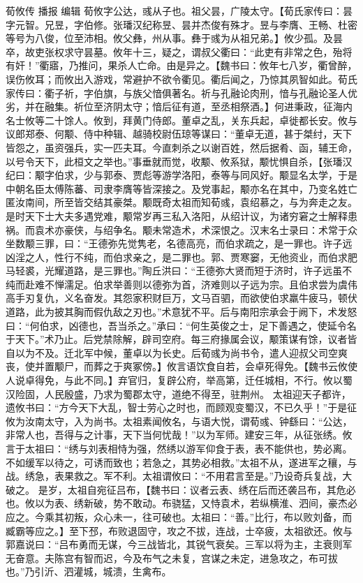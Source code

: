 \documentclass[12pt,UTF8]{ctexbook}
\begin{document}
荀攸传
播报
编辑
荀攸字公达，彧从子也。祖父昙，广陵太守。【荀氏家传曰：昙字元智。兄昱，字伯修。张璠汉纪称昱、昙并杰俊有殊才。昱与李膺、王畅、杜密等号为八俊，位至沛相。攸父彝，州从事。彝于彧为从祖兄弟。】攸少孤。及昙卒，故吏张权求守昙墓。攸年十三，疑之，谓叔父衢曰：“此吏有非常之色，殆将有奸！”衢寤，乃推问，果杀人亡命。由是异之。【魏书曰：攸年七八岁，衢曾醉，误伤攸耳；而攸出入游戏，常避护不欲令衢见。衢后闻之，乃惊其夙智如此。荀氏家传曰：衢子祈，字伯旗，与族父愔俱著名。祈与孔融论肉刑，愔与孔融论圣人优劣，并在融集。祈位至济阴太守；愔后征有道，至丞相祭酒。】何进秉政，征海内名士攸等二十馀人。攸到，拜黄门侍郎。董卓之乱，关东兵起，卓徙都长安。攸与议郎郑泰、何颙、侍中种辑、越骑校尉伍琼等谋曰：“董卓无道，甚于桀纣，天下皆怨之，虽资强兵，实一匹夫耳。今直刺杀之以谢百姓，然后据肴、函，辅王命，以号令天下，此桓文之举也。”事垂就而觉，收颙、攸系狱，颙忧惧自杀，【张璠汉纪曰：颙字伯求，少与郭泰、贾彪等游学洛阳，泰等与同风好。颙显名太学，于是中朝名臣太傅陈蕃、司隶李膺等皆深接之。及党事起，颙亦名在其中，乃变名姓亡匿汝南间，所至皆交结其豪桀。颙既奇太祖而知荀彧，袁绍慕之，与为奔走之友。是时天下士大夫多遇党难，颙常岁再三私入洛阳，从绍计议，为诸穷窘之士解释患祸。而袁术亦豪侠，与绍争名。颙未常造术，术深恨之。汉末名士录曰：术常于众坐数颙三罪，曰：“王德弥先觉隽老，名德高亮，而伯求疏之，是一罪也。许子远凶淫之人，性行不纯，而伯求亲之，是二罪也。郭、贾寒窭，无他资业，而伯求肥马轻裘，光耀道路，是三罪也。”陶丘洪曰：“王德弥大贤而短于济时，许子远虽不纯而赴难不惮濡足。伯求举善则以德弥为首，济难则以子远为宗。且伯求尝为虞伟高手刃复仇，义名奋发。其怨家积财巨万，文马百驷，而欲使伯求羸牛疲马，顿伏道路，此为披其胸而假仇敌之刃也。”术意犹不平。后与南阳宗承会于阙下，术发怒曰：“何伯求，凶德也，吾当杀之。”承曰：“何生英俊之士，足下善遇之，使延令名于天下。”术乃止。后党禁除解，辟司空府。每三府掾属会议，颙策谋有馀，议者皆自以为不及。迁北军中候，董卓以为长史。后荀彧为尚书令，遣人迎叔父司空爽丧，使并置颙尸，而葬之于爽冢傍。】攸言语饮食自若，会卓死得免。【魏书云攸使人说卓得免，与此不同。】弃官归，复辟公府，举高第，迁任城相，不行。攸以蜀汉险固，人民殷盛，乃求为蜀郡太守，道绝不得至，驻荆州。
太祖迎天子都许，遗攸书曰：“方今天下大乱，智士劳心之时也，而顾观变蜀汉，不已久乎！”于是征攸为汝南太守，入为尚书。太祖素闻攸名，与语大悦，谓荀彧、钟繇曰：“公达，非常人也，吾得与之计事，天下当何忧哉！”以为军师。建安三年，从征张绣。攸言于太祖曰：“绣与刘表相恃为强，然绣以游军仰食于表，表不能供也，势必离。不如缓军以待之，可诱而致也；若急之，其势必相救。”太祖不从，遂进军之穰，与战。绣急，表果救之。军不利。太祖谓攸曰：“不用君言至是。”乃设奇兵复战，大破之。
是岁，太祖自宛征吕布，【魏书曰：议者云表、绣在后而还袭吕布，其危必也。攸以为表、绣新破，势不敢动。布骁猛，又恃袁术，若纵横淮、泗间，豪杰必应之。今乘其初叛，众心未一，往可破也。太祖曰：“善。”比行，布以败刘备，而臧霸等应之。】至下邳，布败退固守，攻之不拔，连战，士卒疲，太祖欲还。攸与郭嘉说曰：“吕布勇而无谋，今三战皆北，其锐气衰矣。三军以将为主，主衰则军无奋意。夫陈宫有智而迟，今及布气之未复，宫谋之未定，进急攻之，布可拔也。”乃引沂、泗灌城，城溃，生禽布。
\end{document}
